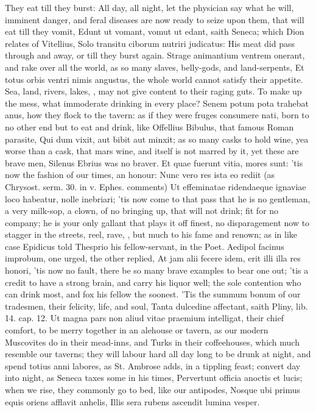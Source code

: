 {{They eat till they burst: All day, all night, let the physician
say what he will, imminent danger, and feral diseases are now ready to
seize upon them, that will eat till they vomit, Edunt ut vomant, vomut
ut edant, saith Seneca; which Dion relates of Vitellius, Solo transitu
ciborum nutriri judicatus: His meat did pass through and away, or till
they burst again. Strage animantium ventrem onerant, and rake
over all the world, as so many slaves, belly-gods, and
land-serpents, Et totus orbis ventri nimis angustus, the whole world
cannot satisfy their appetite. Sea, land, rivers, lakes, \etc{}, may
not give content to their raging guts. To make up the mess, what
immoderate drinking in every place? Senem potum pota trahebat anus, how
they flock to the tavern: as if they were fruges consumere nati, born
to no other end but to eat and drink, like Offellius Bibulus, that
famous Roman parasite, Qui dum vixit, aut bibit aut minxit; as so many
casks to hold wine, yea worse than a cask, that mars wine, and itself
is not marred by it, yet these are brave men, Silenus Ebrius was no
braver. Et quae fuerunt vitia, mores sunt: 'tis now the fashion of our
times, an honour: Nunc vero res ista eo rediit (as Chrysost. serm. 30.
in v. Ephes. comments) Ut effeminatae ridendaeque ignaviae loco
habeatur, nolle inebriari; 'tis now come to that pass that he is no
gentleman, a very milk-sop, a clown, of no bringing up, that will not
drink; fit for no company; he is your only gallant that plays it off
finest, no disparagement now to stagger in the streets, reel, rave,
\etc{}, but much to his fame and renown; as in like case Epidicus told
Thesprio his fellow-servant, in the Poet. Aedipol facinus
improbum, one urged, the other replied, At jam alii fecere idem, erit
illi illa res honori, 'tis now no fault, there be so many brave
examples to bear one out; 'tis a credit to have a strong brain, and
carry his liquor well; the sole contention who can drink most, and fox
his fellow the soonest. 'Tis the summum bonum of our tradesmen, their
felicity, life, and soul, Tanta dulcedine affectant, saith Pliny, lib.
14. cap. 12. Ut magna pars non aliud vitae praemium intelligat, their
chief comfort, to be merry together in an alehouse or tavern, as our
modern Muscovites do in their mead-inns, and Turks in their
coffeehouses, which much resemble our taverns; they will labour hard
all day long to be drunk at night, and spend totius anni labores, as
St. Ambrose adds, in a tippling feast; convert day into night, as
Seneca taxes some in his times, Pervertunt officia anoctis et lucis;
when we rise, they commonly go to bed, like our antipodes,
Nosque ubi primus equis oriens afflavit anhelis,
Illis sera rubens ascendit lumina vesper.

}}
